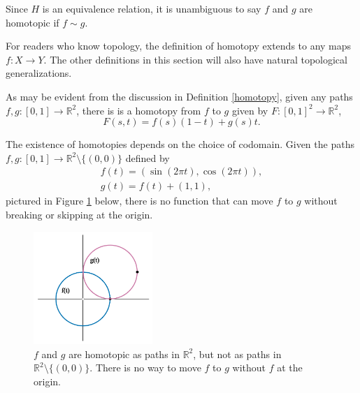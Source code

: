 \documentclass{amsart}
\begin{document}
	Since \(H\) is an equivalence relation, it is unambiguous to say \(f\) and
	\(g\) are homotopic if \(f\sim g\).

\begin{remark}
   For readers who know topology, the definition of homotopy
	extends to any maps \(f: X\to Y\). The other definitions in this section
	will also have natural topological generalizations.
\end{remark}

\begin{example}
	As may be evident from the discussion in Definition \ref{homotopy}, given
	any paths \(f, g: [0, 1]\to \mathbb{R}^2\), there is is a homotopy from
	\(f\) to \(g\) given by \(F: [0, 1]^2\to\mathbb{R}^2\), 
	\[
	   F(s, t) = f(s)(1-t) + g(s)t.
	\]
\end{example}

\begin{example}
	The existence of homotopies depends on the choice of
	codomain. Given the paths \(f, g: [0, 1]\to
	\mathbb{R}^2\setminus\{(0, 0)\}\) defined by 
	\begin{align*}
	   f(t) = (\sin(2\pi t), \cos(2\pi t)),\\
		g(t) = f(t) + (1, 1),
	\end{align*}
	pictured in Figure \ref{circles} below, there is no function
	that can move \(f\) to \(g\) without breaking or skipping at the origin.

	\begin{figure}[!h]
	   \centering
		\includegraphics[width = 0.4\textwidth]{Inkscape Files/circles.png}
		\caption{\(f\) and \(g\) are homotopic as paths in \(\mathbb{R}^2\), but
		not as paths in \(\mathbb{R}^2\setminus\{(0, 0)\}\). There is no way to
		move \(f\) to \(g\) without \(f\) at the origin.}
		\label{circles}
	\end{figure}
\end{example}
\end{document}
